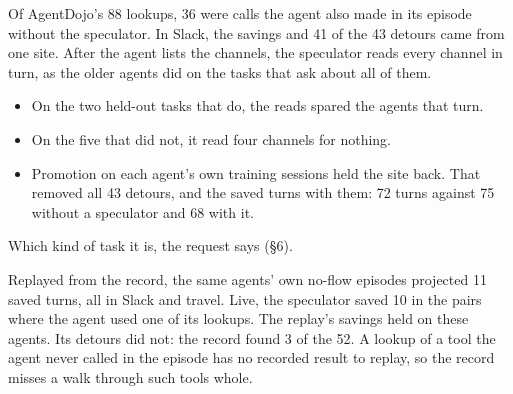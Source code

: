 \documentclass[10pt,twocolumn,letterpaper]{article}
\providecommand{\tightlist}{\setlength{\itemsep}{0pt}\setlength{\parskip}{0pt}}
\begin{document}
Of AgentDojo's 88 lookups, 36 were calls the agent also made in its episode without the speculator. In Slack, the savings and 41 of the 43 detours came from one site. After the agent lists the channels, the speculator reads every channel in turn, as the older agents did on the tasks that ask about all of them.

\begin{itemize}
\tightlist
\item
  On the two held-out tasks that do, the reads spared the agents that turn.
\item
  On the five that did not, it read four channels for nothing.
\item
  Promotion on each agent's own training sessions held the site back. That removed all 43 detours, and the saved turns with them: 72 turns against 75 without a speculator and 68 with it.
\end{itemize}

Which kind of task it is, the request says (§6).

Replayed from the record, the same agents' own no-flow episodes projected 11 saved turns, all in Slack and travel. Live, the speculator saved 10 in the pairs where the agent used one of its lookups. The replay's savings held on these agents. Its detours did not: the record found 3 of the 52. A lookup of a tool the agent never called in the episode has no recorded result to replay, so the record misses a walk through such tools whole.
\end{document}
